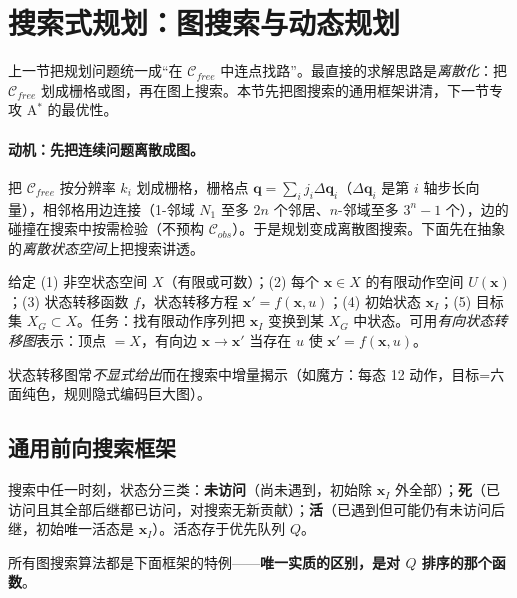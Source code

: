 \section{搜索式规划：图搜索与动态规划}
\label{sec:plan-search}

上一节把规划问题统一成“在 $\mathcal{C}_{free}$ 中连点找路”。最直接的求解思路是\emph{离散化}：把 $\mathcal{C}_{free}$ 划成栅格或图，再在图上搜索。本节先把图搜索的通用框架讲清，下一节专攻 A$^*$ 的最优性。

\paragraph{动机：先把连续问题离散成图。}
把 $\mathcal{C}_{free}$ 按分辨率 $k_i$ 划成栅格，栅格点 $\mathbf{q}=\sum_i j_i\Delta\mathbf{q}_i$（$\Delta\mathbf{q}_i$ 是第 $i$ 轴步长向量），相邻格用边连接（1-邻域 $N_1$ 至多 $2n$ 个邻居、$n$-邻域至多 $3^n-1$ 个），边的碰撞在搜索中按需检验（不预构 $\mathcal{C}_{obs}$）。于是规划变成离散图搜索。下面先在抽象的\emph{离散状态空间}上把搜索讲透。

\begin{definition}[离散可行规划问题]\label{def:plan-discrete}
给定 (1) 非空状态空间 $X$（有限或可数）；(2) 每个 $\mathbf{x}\in X$ 的有限动作空间 $U(\mathbf{x})$；(3) 状态转移函数 $f$，状态转移方程 $\mathbf{x}'=f(\mathbf{x},u)$；(4) 初始状态 $\mathbf{x}_I$；(5) 目标集 $X_G\subset X$。任务：找有限动作序列把 $\mathbf{x}_I$ 变换到某 $X_G$ 中状态。可用\emph{有向状态转移图}表示：顶点 $=X$，有向边 $\mathbf{x}\to\mathbf{x}'$ 当存在 $u$ 使 $\mathbf{x}'=f(\mathbf{x},u)$。
\end{definition}

\noindent 状态转移图常\emph{不显式给出}而在搜索中增量揭示（如魔方：每态 12 动作，目标=六面纯色，规则隐式编码巨大图）。

\subsection{通用前向搜索框架}
\label{sec:plan-forward}

搜索中任一时刻，状态分三类\cite{lavalle2006planning}：\textbf{未访问}（尚未遇到，初始除 $\mathbf{x}_I$ 外全部）；\textbf{死}（已访问且其全部后继都已访问，对搜索无新贡献）；\textbf{活}（已遇到但可能仍有未访问后继，初始唯一活态是 $\mathbf{x}_I$）。活态存于优先队列 $Q$。

\begin{algo}[通用前向搜索]\label{alg:plan-forward}
所有图搜索算法都是下面框架的特例——\textbf{唯一实质的区别，是对 $Q$ 排序的那个函数}。
\end{algo}

